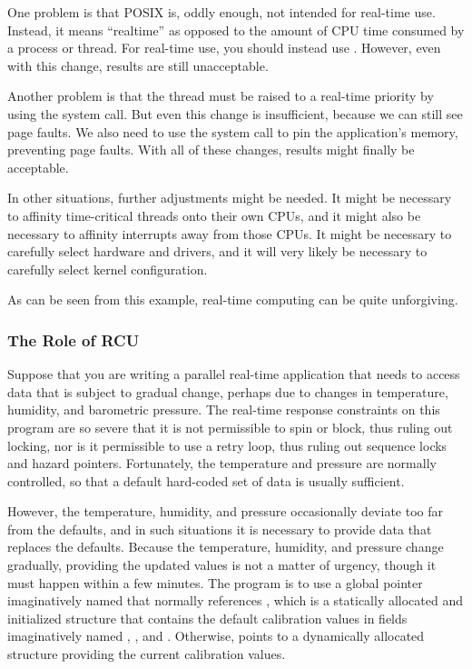 One problem is that POSIX  is, oddly enough, not intended
for real-time use.
Instead, it means ``realtime'' as opposed to the amount of CPU time
consumed by a process or thread.
For real-time use, you should instead use .
However, even with this change, results are still unacceptable.

Another problem is that the thread must be raised to a real-time
priority by using the  system call.
But even this change is insufficient, because we can still see
page faults.
We also need to use the  system call to pin the
application's memory, preventing page faults.
With all of these changes, results might finally be acceptable.

In other situations, further adjustments might be needed.
It might be necessary to affinity time-critical threads onto their
own CPUs, and it might also be necessary to affinity interrupts
away from those CPUs.
It might be necessary to carefully select hardware and drivers,
and it will very likely be necessary to carefully select kernel
configuration.

As can be seen from this example, real-time computing can be quite
unforgiving.

\subsubsection{The Role of RCU}
\label{sec:advsync:The Role of RCU}

Suppose that you are writing a parallel real-time application that needs
to access
data that is subject to gradual change, perhaps due to changes in
temperature, humidity, and barometric pressure.
The real-time response constraints on this program are so severe that
it is not permissible to spin or block, thus ruling out locking,
nor is it permissible to use a retry loop, thus ruling out sequence locks
and hazard pointers.
Fortunately, the temperature and pressure are normally controlled,
so that a default hard-coded set of data is usually sufficient.

However, the temperature, humidity, and pressure occasionally deviate too far
from the defaults, and in such situations it is necessary to provide
data that replaces the defaults.
Because the temperature, humidity, and pressure change gradually,
providing the updated values is not a matter of urgency, though
it must happen within a few minutes.
The program is to use a global pointer imaginatively named 
that normally references , which is a statically allocated
and initialized structure that contains the default calibration values
in fields imaginatively named , , and .
Otherwise,  points to a dynamically allocated
structure providing the current calibration values.

